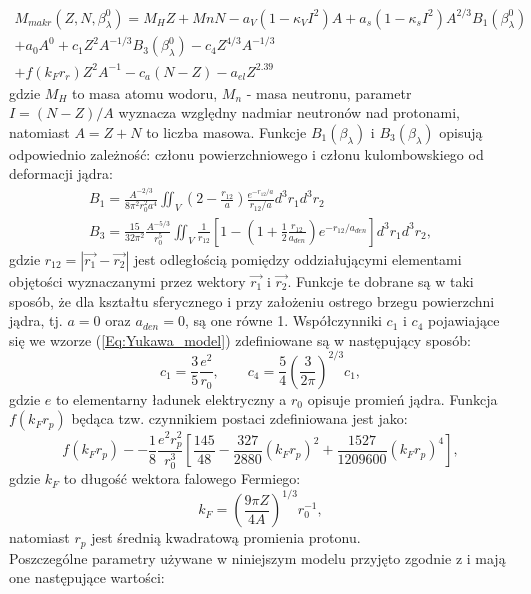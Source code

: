\documentclass[a4paper,polish]{article}
\numberwithin{equation}{section}
\begin{document}
\begin{equation} \label{Eq:Yukawa_model}
\begin{gathered}
M_{makr}(Z,N,\beta^0_{\lambda})=M_{H}Z+M{n}N-a_{V}(1-\kappa_{V}I^2)A+a_{s}(1-\kappa_{s}I^2)A^{2/3}B_{1}(\beta^{0}_{\lambda}) \\
+a_{0}A^{0}+c_{1}Z^{2}A^{-1/3}B_{3}(\beta^{0}_{\lambda})-c_{4}Z^{4/3}A^{-1/3} \\
+f(k_{F}r_{r})Z^{2}A^{-1}-c_{a}(N-Z)-a_{el}Z^{2.39}
\end{gathered}
\end{equation}
gdzie $M_{H}$ to masa atomu wodoru, $M_{n}$ - masa neutronu, parametr $I=(N-Z)/A$ wyznacza względny nadmiar neutronów nad protonami, natomiast $A=Z+N$ to liczba masowa. Funkcje $B_{1}(\beta_{\lambda})$ i $B_{3}(\beta_{\lambda})$ opisują odpowiednio zależność: członu powierzchniowego i członu kulombowskiego od deformacji jądra:
\begin{gather}
B_{1}=\frac{A^{-2/3}}{8\pi^{2}r^{2}_{0}a^{4}}\iint_V\left(2-\frac{r_{12}}{a}\right)\frac{e^{-r_{12}/a}}{r_{12}/a}d^{3}r_{1}d^{3}r_{2} \\
B_{3}=\frac{15}{32\pi^{2}}\frac{A^{-5/3}}{r^{5}_{0}}\iint_V\frac{1}{r_{12}}\left[1-\left(1+\frac{1}{2}\frac{r_{12}}{a_{den}}\right)e^{-r_{12}/a_{den}}\right]d^{3}r_{1}d^{3}r_{2},
\end{gather}
gdzie $r_{12}=\left|\vec{r_{1}}-\vec{r_{2}}\right|$ jest odległością pomiędzy oddziałującymi 
elementami objętości wyznaczanymi przez wektory $\vec{r_{1}}$ i $\vec{r_{2}}$. Funkcje te dobrane 
są w taki sposób, że dla kształtu sferycznego i przy założeniu ostrego brzegu powierzchni jądra, tj. $a=0$ oraz $a_{den}=0$, są one równe 1. Współczynniki $c_{1}$ i $c_{4}$ pojawiające się we wzorze (\ref{Eq:Yukawa_model}) zdefiniowane są w następujący sposób:
\begin{equation}
c_{1}=\frac{3}{5}\frac{e^{2}}{r_{0}}, \qquad c_{4}=\frac{5}{4}\left(\frac{3}{2\pi}\right)^{2/3}c_{1},
\end{equation}
gdzie $e$ to elementarny ładunek elektryczny a $r_{0}$ opisuje promień jądra. Funkcja $f(k_{F}r_{p})$ będąca tzw. czynnikiem postaci zdefiniowana jest jako:
\begin{equation}
f(k_{F}r_{p})--\frac{1}{8}\frac{e^{2}r^{2}_{p}}{r^{3}_{0}}\left[\frac{145}{48}-\frac{327}{2880}(k_{F}r_{p})^{2}+\frac{1527}{1209600}(k_{F}r_{p})^{4}\right],
\end{equation}
gdzie $k_{F}$ to długość wektora falowego Fermiego:
\begin{equation}
k_{F}=\left(\frac{9\pi Z}{4A}\right)^{1/3}r^{-1}_{0},
\end{equation}
natomiast $r_{p}$ jest średnią kwadratową promienia protonu. \\
Poszczególne parametry używane w niniejszym modelu przyjęto zgodnie z \cite{Moll1,Moll2} i mają one następujące wartości:
\end{document}
